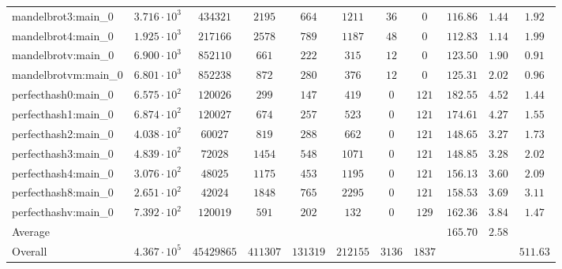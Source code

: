 \begin{tabular}{|l|c|c|c|c|c|c|c|c|c|c|}
mandelbrot3:main\_0            & $ 3.716 \cdot 10^{3} $ & $ 434321   $ & $ 2195   $ & $ 664    $ & $ 1211   $ & $ 36   $ & $ 0    $ & $ 116.86      $ & $ 1.44    $ & $ 1.92    $ \\
mandelbrot4:main\_0            & $ 1.925 \cdot 10^{3} $ & $ 217166   $ & $ 2578   $ & $ 789    $ & $ 1187   $ & $ 48   $ & $ 0    $ & $ 112.83      $ & $ 1.14    $ & $ 1.99    $ \\
mandelbrotv:main\_0            & $ 6.900 \cdot 10^{3} $ & $ 852110   $ & $ 661    $ & $ 222    $ & $ 315    $ & $ 12   $ & $ 0    $ & $ 123.50      $ & $ 1.90    $ & $ 0.91    $ \\
mandelbrotvm:main\_0           & $ 6.801 \cdot 10^{3} $ & $ 852238   $ & $ 872    $ & $ 280    $ & $ 376    $ & $ 12   $ & $ 0    $ & $ 125.31      $ & $ 2.02    $ & $ 0.96    $ \\
perfecthash0:main\_0           & $ 6.575 \cdot 10^{2} $ & $ 120026   $ & $ 299    $ & $ 147    $ & $ 419    $ & $ 0    $ & $ 121  $ & $ 182.55      $ & $ 4.52    $ & $ 1.44    $ \\
perfecthash1:main\_0           & $ 6.874 \cdot 10^{2} $ & $ 120027   $ & $ 674    $ & $ 257    $ & $ 523    $ & $ 0    $ & $ 121  $ & $ 174.61      $ & $ 4.27    $ & $ 1.55    $ \\
perfecthash2:main\_0           & $ 4.038 \cdot 10^{2} $ & $ 60027    $ & $ 819    $ & $ 288    $ & $ 662    $ & $ 0    $ & $ 121  $ & $ 148.65      $ & $ 3.27    $ & $ 1.73    $ \\
perfecthash3:main\_0           & $ 4.839 \cdot 10^{2} $ & $ 72028    $ & $ 1454   $ & $ 548    $ & $ 1071   $ & $ 0    $ & $ 121  $ & $ 148.85      $ & $ 3.28    $ & $ 2.02    $ \\
perfecthash4:main\_0           & $ 3.076 \cdot 10^{2} $ & $ 48025    $ & $ 1175   $ & $ 453    $ & $ 1195   $ & $ 0    $ & $ 121  $ & $ 156.13      $ & $ 3.60    $ & $ 2.09    $ \\
perfecthash8:main\_0           & $ 2.651 \cdot 10^{2} $ & $ 42024    $ & $ 1848   $ & $ 765    $ & $ 2295   $ & $ 0    $ & $ 121  $ & $ 158.53      $ & $ 3.69    $ & $ 3.11    $ \\
perfecthashv:main\_0           & $ 7.392 \cdot 10^{2} $ & $ 120019   $ & $ 591    $ & $ 202    $ & $ 132    $ & $ 0    $ & $ 129  $ & $ 162.36      $ & $ 3.84    $ & $ 1.47    $ \\
\hline
Average                        & $                    $ & $          $ & $        $ & $        $ & $        $ & $      $ & $      $ & $ 165.70      $ & $ 2.58    $ & $         $ \\
\hline
Overall                        & $ 4.367 \cdot 10^{5} $ & $ 45429865 $ & $ 411307 $ & $ 131319 $ & $ 212155 $ & $ 3136 $ & $ 1837 $ & $             $ & $         $ & $ 511.63  $ \\
\hline
\end{tabular}
